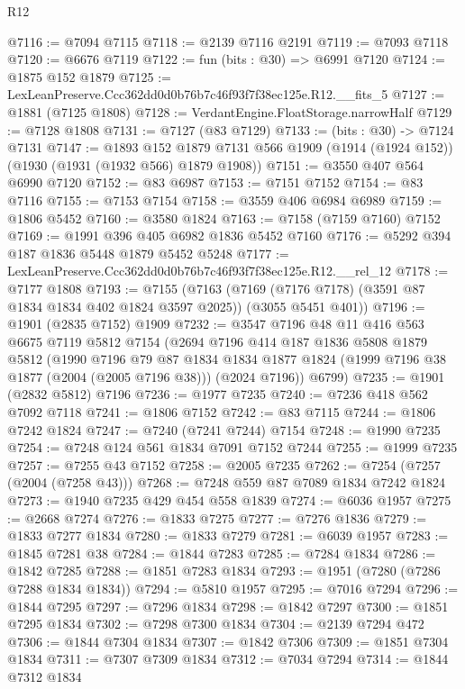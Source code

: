 \begin{lexlean}{R12}
\begin{coremodule}
@7116 := @7094 @7115
@7118 := @2139 @7116 @2191
@7119 := @7093 @7118
@7120 := @6676 @7119
@7122 := fun (bits : @30) => @6991 @7120
@7124 := @1875 @152 @1879
@7125 := LexLeanPreserve.Ccc362dd0d0b76b7c46f93f7f38ec125e.R12.__fits_5
@7127 := @1881 (@7125 @1808)
@7128 := VerdantEngine.FloatStorage.narrowHalf
@7129 := @7128 @1808
@7131 := @7127 (@83 @7129)
@7133 := (bits : @30) -> @7124 @7131
@7147 := @1893
    @152
    @1879
    @7131
    @566
    @1909
    (@1914 (@1924 @152))
    (@1930 (@1931 (@1932 @566) @1879 @1908))
@7151 := @3550 @407 @564 @6990 @7120
@7152 := @83 @6987
@7153 := @7151 @7152
@7154 := @83 @7116
@7155 := @7153 @7154
@7158 := @3559 @406 @6984 @6989
@7159 := @1806 @5452
@7160 := @3580 @1824
@7163 := @7158 (@7159 @7160) @7152
@7169 := @1991 @396 @405 @6982 @1836 @5452 @7160
@7176 := @5292 @394 @187 @1836 @5448 @1879 @5452 @5248
@7177 := LexLeanPreserve.Ccc362dd0d0b76b7c46f93f7f38ec125e.R12.__rel_12
@7178 := @7177 @1808
@7193 := @7155
    (@7163 (@7169 (@7176 @7178) (@3591 @87 @1834 @1834 @402 @1824 @3597 @2025)) (@3055 @5451 @401))
@7196 := @1901 (@2835 @7152) @1909
@7232 := @3547
    @7196
    @48
    @11
    @416
    @563
    @6675
    @7119
    @5812
    @7154
    (@2694
      @7196
      @414
      @187
      @1836
      @5808
      @1879
      @5812
      (@1990
        @7196
        @79
        @87
        @1834
        @1834
        @1877
        @1824
        (@1999 @7196 @38 @1877 (@2004 (@2005 @7196 @38)))
        (@2024 @7196))
      @6799)
@7235 := @1901 (@2832 @5812) @7196
@7236 := @1977 @7235
@7240 := @7236 @418 @562 @7092 @7118
@7241 := @1806 @7152
@7242 := @83 @7115
@7244 := @1806 @7242 @1824
@7247 := @7240 (@7241 @7244) @7154
@7248 := @1990 @7235
@7254 := @7248 @124 @561 @1834 @7091 @7152 @7244
@7255 := @1999 @7235
@7257 := @7255 @43 @7152
@7258 := @2005 @7235
@7262 := @7254 (@7257 (@2004 (@7258 @43)))
@7268 := @7248 @559 @87 @7089 @1834 @7242 @1824
@7273 := @1940 @7235 @429 @454 @558 @1839
@7274 := @6036 @1957
@7275 := @2668 @7274
@7276 := @1833 @7275
@7277 := @7276 @1836
@7279 := @1833 @7277 @1834
@7280 := @1833 @7279
@7281 := @6039 @1957
@7283 := @1845 @7281 @38
@7284 := @1844 @7283
@7285 := @7284 @1834
@7286 := @1842 @7285
@7288 := @1851 @7283 @1834
@7293 := @1951 (@7280 (@7286 @7288 @1834 @1834))
@7294 := @5810 @1957
@7295 := @7016 @7294
@7296 := @1844 @7295
@7297 := @7296 @1834
@7298 := @1842 @7297
@7300 := @1851 @7295 @1834
@7302 := @7298 @7300 @1834
@7304 := @2139 @7294 @472
@7306 := @1844 @7304 @1834
@7307 := @1842 @7306
@7309 := @1851 @7304 @1834
@7311 := @7307 @7309 @1834
@7312 := @7034 @7294
@7314 := @1844 @7312 @1834

\end{coremodule}
\end{lexlean}
